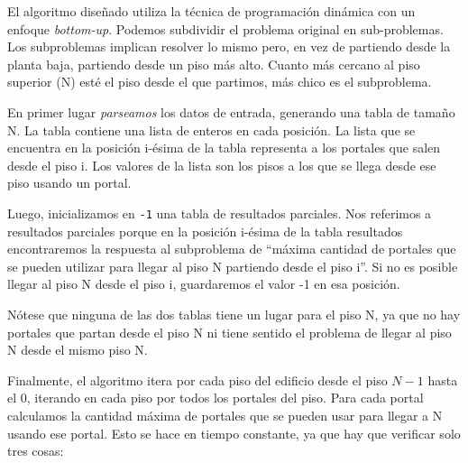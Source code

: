 El algoritmo diseñado utiliza la técnica de programación dinámica con un enfoque \textit{bottom-up}. Podemos subdividir el problema original en sub-problemas. Los subproblemas implican resolver lo mismo pero, en vez de partiendo desde la planta baja, partiendo desde un piso más alto. Cuanto más cercano al piso superior (N) esté el piso desde el que partimos, más chico es el subproblema.

En primer lugar \textit{parseamos} los datos de entrada, generando una tabla de tamaño N. La tabla contiene una lista de enteros en cada posición. La lista que se encuentra en la posición i-ésima de la tabla representa a los portales que salen desde el piso i. Los valores de la lista son los pisos a los que se llega desde ese piso usando un portal.

Luego, inicializamos en \texttt{-1} una tabla de resultados parciales. Nos referimos a resultados parciales porque en la posición i-ésima de la tabla resultados encontraremos la respuesta al subproblema de ``máxima cantidad de portales que se pueden utilizar para llegar al piso N partiendo desde el piso i''. Si no es posible llegar al piso N desde el piso i, guardaremos el valor -1 en esa posición.

Nótese que ninguna de las dos tablas tiene un lugar para el piso N, ya que no hay portales que partan desde el piso N ni tiene sentido el problema de llegar al piso N desde el mismo piso N.

Finalmente, el algoritmo itera por cada piso del edificio desde el piso $N-1$ hasta el 0, iterando en cada piso por todos los portales del piso. Para cada portal calculamos la cantidad máxima de portales que se pueden usar para llegar a N usando ese portal. Esto se hace en tiempo constante, ya que hay que verificar solo tres cosas: 

